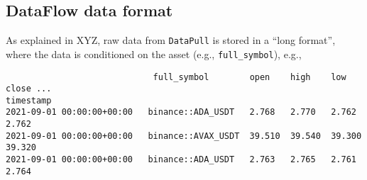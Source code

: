 \documentclass[11pt, reqno]{amsart}
\theoremstyle{definition}
\theoremstyle{remark}
\begin{document}

  \subsection{DataFlow data format}

  As explained in XYZ, raw data from \verb|DataPull| is stored in a ``long format'',
  where the data is conditioned on the asset (e.g., \verb|full_symbol|), e.g.,

  \begin{verbatim}
                             full_symbol        open    high    low     close ...
timestamp
2021-09-01 00:00:00+00:00   binance::ADA_USDT   2.768   2.770   2.762   2.762
2021-09-01 00:00:00+00:00   binance::AVAX_USDT  39.510  39.540  39.300 39.320
2021-09-01 00:00:00+00:00   binance::ADA_USDT   2.763   2.765   2.761   2.764
\end{verbatim}
\end{document}
